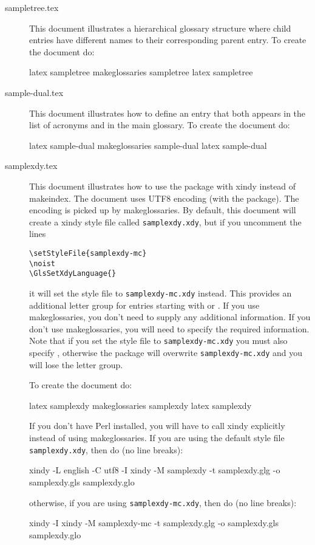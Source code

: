 \documentclass{nlctdoc}
\begin{document}
\begin{description}
\item[sampletree.tex]\label{ex:sampletree} This document illustrates
a hierarchical glossary structure where child entries have different
names to their corresponding parent entry. To create the document
do:
\begin{prompt}
latex sampletree
makeglossaries sampletree
latex sampletree
\end{prompt}

\item[sample-dual.tex]\label{ex:sample-dual} This document
illustrates how to define an entry that both appears in the list of
acronyms and in the main glossary. To create the document do:
\begin{prompt}
latex sample-dual
makeglossaries sample-dual
latex sample-dual
\end{prompt}

\item[samplexdy.tex]\label{ex:samplexdy} This document illustrates
how to use the  package with \gls{xindy} instead
of \gls{makeindex}. The document uses UTF8 encoding (with the
 package). The encoding is picked up by
\gls{makeglossaries}. By default, this document will create a
\gls{xindy} style file called \texttt{samplexdy.xdy}, but if you
uncomment the lines
\begin{verbatim}
\setStyleFile{samplexdy-mc}
\noist
\GlsSetXdyLanguage{}
\end{verbatim}
it will set the style file to \texttt{samplexdy-mc.xdy} instead.
This provides an additional letter group for entries starting with
 or . If you use \gls{makeglossaries}, you don't
need to supply any additional information. If you don't use
\gls*{makeglossaries}, you will need to specify the required
information. Note that if you set the style file to
\texttt{samplexdy-mc.xdy} you must also specify ,
otherwise the  package will overwrite
\texttt{samplexdy-mc.xdy} and you will lose the  letter
group.

To create the document do:
\begin{prompt}
latex samplexdy
makeglossaries samplexdy
latex samplexdy
\end{prompt}
If you don't have Perl installed, you will have to call 
\gls{xindy} explicitly instead of using \gls{makeglossaries}.
If you are using the default style file \texttt{samplexdy.xdy}, then
do (no line breaks):
\begin{prompt}
xindy -L english -C utf8 -I xindy -M samplexdy -t samplexdy.glg -o samplexdy.gls samplexdy.glo
\end{prompt}
otherwise, if you are using \texttt{samplexdy-mc.xdy}, then do
(no line breaks):
\begin{prompt}
xindy -I xindy -M samplexdy-mc -t samplexdy.glg -o samplexdy.gls samplexdy.glo
\end{prompt}


\end{description}
\end{document}
